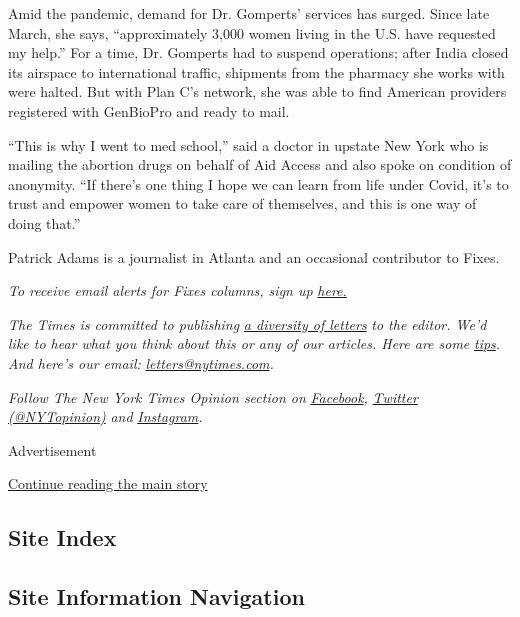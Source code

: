 Amid the pandemic, demand for Dr. Gomperts' services has surged. Since
late March, she says, ``approximately 3,000 women living in the U.S.
have requested my help.'' For a time, Dr. Gomperts had to suspend
operations; after India closed its airspace to international traffic,
shipments from the pharmacy she works with were halted. But with Plan
C's network, she was able to find American providers registered with
GenBioPro and ready to mail.

``This is why I went to med school,'' said a doctor in upstate New York
who is mailing the abortion drugs on behalf of Aid Access and also spoke
on condition of anonymity. ``If there's one thing I hope we can learn
from life under Covid, it's to trust and empower women to take care of
themselves, and this is one way of doing that.''

Patrick Adams is a journalist in Atlanta and an occasional contributor
to Fixes.

\emph{To receive email alerts for Fixes columns, sign up}
\href{http://eepurl.com/ABIxL}{\emph{here.}}

\emph{The Times is committed to publishing}
\href{https://www.nytimes.com/2019/01/31/opinion/letters/letters-to-editor-new-york-times-women.html}{\emph{a
diversity of letters}} \emph{to the editor. We'd like to hear what you
think about this or any of our articles. Here are some}
\href{https://help.nytimes.com/hc/en-us/articles/115014925288-How-to-submit-a-letter-to-the-editor}{\emph{tips}}\emph{.
And here's our email:}
\href{mailto:letters@nytimes.com}{\emph{letters@nytimes.com}}\emph{.}

\emph{Follow The New York Times Opinion section on}
\href{https://www.facebook.com/nytopinion}{\emph{Facebook}}\emph{,}
\href{http://twitter.com/NYTOpinion}{\emph{Twitter (@NYTopinion)}}
\emph{and}
\href{https://www.instagram.com/nytopinion/}{\emph{Instagram}}\emph{.}

Advertisement

\protect\hyperlink{after-bottom}{Continue reading the main story}

\hypertarget{site-index}{%
\subsection{Site Index}\label{site-index}}

\hypertarget{site-information-navigation}{%
\subsection{Site Information
Navigation}\label{site-information-navigation}}

